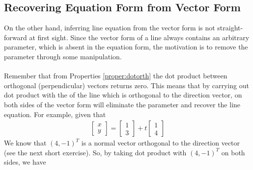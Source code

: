 \subsection{Recovering Equation Form from Vector Form} On the other hand, inferring line equation from the vector form is not straight-forward at first sight. Since the vector form of a line always contains an arbitrary parameter, which is absent in the equation form, the motivation is to remove the parameter through some manipulation.\\
\\
Remember that from Properties \ref{proper:dotorth} the dot product between orthogonal (perpendicular) vectors returns zero. This means that by carrying out dot product with the  of the line which is orthogonal to the direction vector, on both sides of the vector form will eliminate the parameter and recover the line equation. For example, given that
\begin{align*}
\begin{bmatrix}
x\\
y
\end{bmatrix}
=
\begin{bmatrix}
1\\
3
\end{bmatrix}
+ t
\begin{bmatrix}
1 \\
4
\end{bmatrix} 
\end{align*}
We know that $(4, -1)^T$ is a normal vector orthogonal to the direction vector (see the next short exercise). So, by taking dot product with $(4, -1)^T$ on both sides, we have
